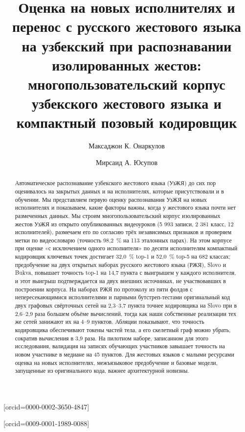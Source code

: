 \documentclass[a4paper,fleqn]{cas-dc}
\newcommand{\authA}{Мирсаид А. Юсупов}
\newcommand{\authB}{Максаджон К. Онаркулов}
\begin{document}
\let\WriteBookmarks\relax
\def\floatpagepagefraction{1}
\def\textpagefraction{.001}
\title[mode=title]{Оценка на новых исполнителях и перенос с русского жестового языка на узбекский при распознавании изолированных жестов: многопользовательский корпус узбекского жестового языка и компактный позовый кодировщик}
\author[1]{\authB}[orcid=0000-0002-3650-4847]
\author[2]{\authA}[orcid=0009-0001-1989-0088]
\cormark[1]
\begin{abstract}
Автоматическое распознавание узбекского жестового языка (УзЖЯ) до сих пор оценивалось на закрытых данных и на исполнителях, которые присутствовали и в обучении. Мы представляем первую оценку распознавания УзЖЯ на новых исполнителях и показываем, какие факторы важны, когда у жестового языка почти нет размеченных данных. Мы строим многопользовательский корпус изолированных жестов УзЖЯ из открыто опубликованных видеоуроков (5 993 записи, 2 381 класс, 12 исполнителей), размечаем его по согласию трёх независимых признаков и проверяем метки по видеословарю (точность 98,2~\% на 113 эталонных парах). На этом корпусе при оценке «с исключением одного исполнителя» по десяти исполнителям компактный кодировщик ключевых точек достигает 32,0~\% top-1 и 52,0~\% top-5 на 682 классах; предобучение на двух открытых наборах русского жестового языка (РЖЯ), Slovo и Bukva, повышает точность top-1 на 14,7 пункта с выигрышем у каждого исполнителя, и этот выигрыш подтверждается на двух внешних источниках, не участвовавших в построении корпуса. На наборах РЖЯ по протоколу из пяти фолдов с непересекающимися исполнителями и парными бутстреп-тестами оригинальный код двух графовых свёрточных сетей на 2,3–3,7 пункта точнее кодировщика на Slovo при в 2,6–2,9 раза большем объёме вычислений, тогда как наши собственные реализации тех же сетей занижают их на 4–9 пунктов. Абляции показывают, что точность кодировщика обеспечивают токены частей тела, а его скелетный граф можно убрать, сократив вычисления в 3,9 раза. На пилотном наборе, записанном для этого исследования, валидация на записях обучающих участников завышает точность на новом участнике в медиане на 45 пунктов. Для жестовых языков с малыми ресурсами оценка на новых исполнителях, межъязыковое предобучение и базовые модели, запущенные из оригинального кода, важнее архитектурной новизны.
\end{abstract}
\end{document}
